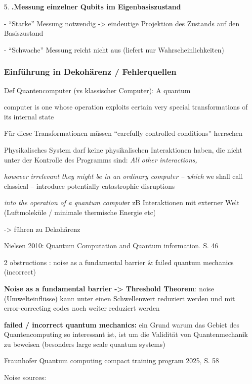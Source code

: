 5. \textbf{.Messung einzelner Qubits im Eigenbasiszustand} 

- “Starke” Messung notwendig -> eindeutige Projektion des Zustands auf den Basiszustand 

- “Schwache” Messung reicht nicht aus (liefert nur Wahrscheinlichkeiten) 

\cite{divincenzo_topics_nodate}
 
\subsubsection{Einführung in Dekohärenz / Fehlerquellen}

Def Quantencomputer (vs klassischer Computer): A quantum 

computer is one whose operation exploits certain very special transformations of its internal state 

Für diese Transformationen müssen “carefully controlled conditions” herrschen 

Physikalisches System darf keine physikalischen Interaktionen haben, die nicht unter der Kontrolle des Programms sind: \textit{All other interactions,} 

\textit{however irrelevant they might be in an ordinary computer – which} we shall call classical – introduce potentially catastrophic disruptions

\textit{into the operation of a quantum comput}er zB Interaktionen mit externer Welt (Luftmoleküle / minimale thermische Energie etc) 

-> führen zu Dekohärenz 
\cite{mermin_quantum_2012}
 

Nielsen 2010: Quantum Computation and Quantum information. S. 46 

2 obstructions : noise as a fundamental barrier \& failed quantum mechanics (incorrect) 

\textbf{Noise as a fundamental barrier -> Threshold Theorem}: noise (Umwelteinflüsse) kann unter einen Schwellenwert reduziert werden und mit error-correcting codes noch weiter reduziert werden 

\textbf{failed / incorrect quantum mechanics:} ein Grund warum das Gebiet des Quantencomputing so interessant ist, ist um die Validität von Quantenmechanik zu beweisen (besonders large scale quantum systems) 

\cite{nielsen_michael_a_and_isaac_l_chuang_quantum_2010}
Fraunhofer Quantum computing compact training program 2025, S. 58 

Noise sources:


